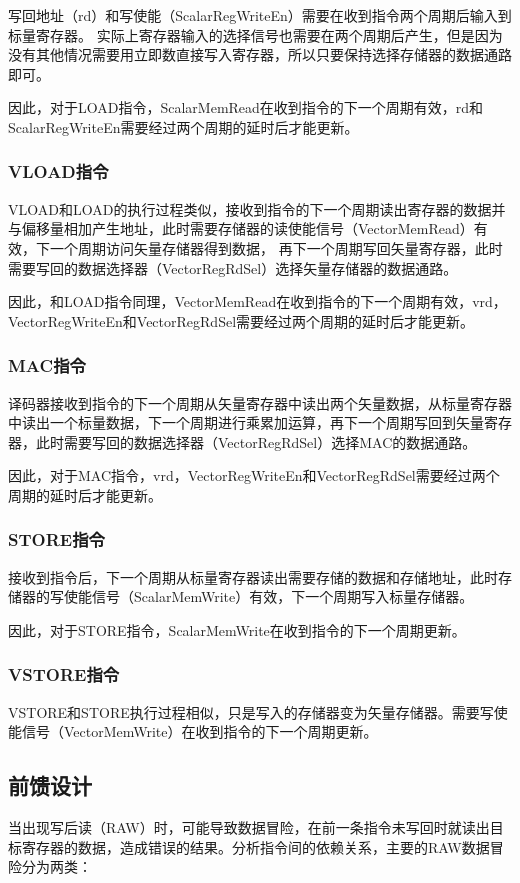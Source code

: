 \documentclass[UTF8]{ctexart}
\begin{document}
写回地址（rd）和写使能（ScalarRegWriteEn）需要在收到指令两个周期后输入到标量寄存器。
实际上寄存器输入的选择信号也需要在两个周期后产生，但是因为没有其他情况需要用立即数直接写入寄存器，所以只要保持选择存储器的数据通路即可。

因此，对于LOAD指令，ScalarMemRead在收到指令的下一个周期有效，rd和ScalarRegWriteEn需要经过两个周期的延时后才能更新。

\subsubsection{VLOAD指令}
VLOAD和LOAD的执行过程类似，接收到指令的下一个周期读出寄存器的数据并与偏移量相加产生地址，此时需要存储器的读使能信号（VectorMemRead）有效，下一个周期访问矢量存储器得到数据，
再下一个周期写回矢量寄存器，此时需要写回的数据选择器（VectorRegRdSel）选择矢量存储器的数据通路。

因此，和LOAD指令同理，VectorMemRead在收到指令的下一个周期有效，vrd，VectorRegWriteEn和VectorRegRdSel需要经过两个周期的延时后才能更新。

\subsubsection{MAC指令}
译码器接收到指令的下一个周期从矢量寄存器中读出两个矢量数据，从标量寄存器中读出一个标量数据，下一个周期进行乘累加运算，再下一个周期写回到矢量寄存器，此时需要写回的数据选择器（VectorRegRdSel）选择MAC的数据通路。

因此，对于MAC指令，vrd，VectorRegWriteEn和VectorRegRdSel需要经过两个周期的延时后才能更新。

\subsubsection{STORE指令}
接收到指令后，下一个周期从标量寄存器读出需要存储的数据和存储地址，此时存储器的写使能信号（ScalarMemWrite）有效，下一个周期写入标量存储器。

因此，对于STORE指令，ScalarMemWrite在收到指令的下一个周期更新。

\subsubsection{VSTORE指令}
VSTORE和STORE执行过程相似，只是写入的存储器变为矢量存储器。需要写使能信号（VectorMemWrite）在收到指令的下一个周期更新。

\subsection{前馈设计}
当出现写后读（RAW）时，可能导致数据冒险，在前一条指令未写回时就读出目标寄存器的数据，造成错误的结果。分析指令间的依赖关系，主要的RAW数据冒险分为两类：
\end{document}
